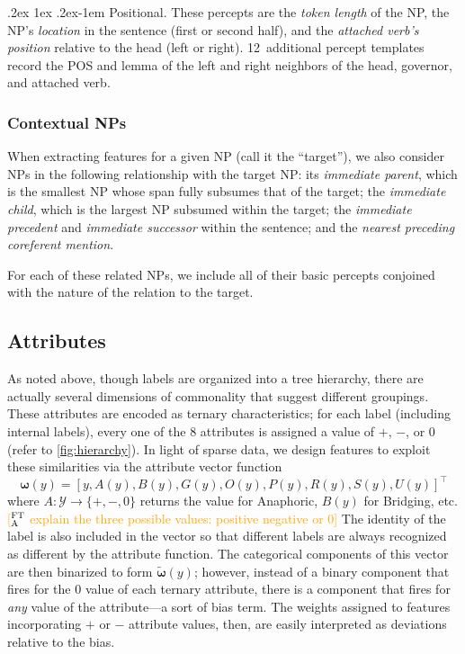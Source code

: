 \documentclass[11pt,letterpaper]{article}
\makeatletter
\newcommand{\ensuretext}[1]{#1}
\newcommand{\nssmarker}{\ensuretext{\textcolor{magenta}{\ensuremath{^{\textsc{NS}}_{\textsc{S}}}}}}
\newcommand{\ftamarker}{\ensuretext{\textcolor{orange}{\ensuremath{^{\textsc{FT}}_{\textsc{A}}}}}}
\newcommand{\arkcomment}[3]{\ensuretext{\textcolor{#3}{[#1 #2]}}}
\newcommand{\nss}[1]{\arkcomment{\nssmarker}{#1}{magenta}}
\newcommand{\fta}[1]{\arkcomment{\ftamarker}{#1}{orange}}
\renewcommand{\paragraph}{%
  \@startsection{paragraph}{4}%
  {\z@}{.2ex \@plus 1ex \@minus .2ex}{-1em}%
  {\normalfont\normalsize\bfseries}%
}
\newcommand{\costversion}[1]{}
\makeatother
\begin{document}
\paragraph{Positional.} 
These percepts are the \emph{token length} of the NP, the NP's \emph{location} in the sentence (first or second half), and 
the \emph{attached verb's position} relative to the head (left or right). 
12~additional percept templates record the POS and lemma of the left and right neighbors of the head, governor, and attached verb.

\subsubsection{Contextual NPs}

When extracting features for a given NP (call it the ``target''), 
we also consider NPs in the following relationship with the target NP:
its \emph{immediate parent}, which is the smallest NP whose span fully subsumes that of the target; 
the \emph{immediate child}, which is the largest NP subsumed within the target;
the \emph{immediate precedent} and \emph{immediate successor} within the sentence; 
and the \emph{nearest preceding coreferent mention}.

For each of these related NPs, we include all of their basic percepts 
conjoined with the nature of the relation to the target.

\subsection{Attributes}\label{sec:attrs}

As noted above, though labels are organized into a tree hierarchy, 
there are actually several dimensions of commonality that suggest different groupings.
These attributes are encoded as ternary characteristics; 
for each label (including internal labels), every one of the 8 attributes  
is assigned a value of $+$, $-$, or $0$ (refer to \cref{fig:hierarchy}).
In light of sparse data, we design features\costversion{ and cost function} to exploit these similarities 
via the attribute vector function
\begin{equation*}
\boldsymbol{\omega}(y) = [y, A(y), B(y), G(y), O(y), P(y), R(y), S(y), U(y)]^{\top}
\end{equation*}
where $A: \costversion{\mathcal{L} \cup \mathcal{I}\nss{}}\mathcal{Y} \rightarrow \{+, -, 0\}$ returns the value for Anaphoric, 
$B(y)$ for Bridging, etc.\fta{explain the three possible values: positive negative or 0} The identity of the label is also included in the vector so that 
different labels are always recognized as different by the attribute function.
The categorical components of this vector are then binarized to form $\tilde{\boldsymbol{\omega}}(y)$; 
however, instead of a binary component that fires for the $0$ value of each ternary attribute, 
there is a component that fires for \emph{any} value of the attribute---a sort of bias term.
The weights assigned to features incorporating $+$ or $-$ attribute values, then, 
are easily interpreted as deviations relative to the bias.
\end{document}
